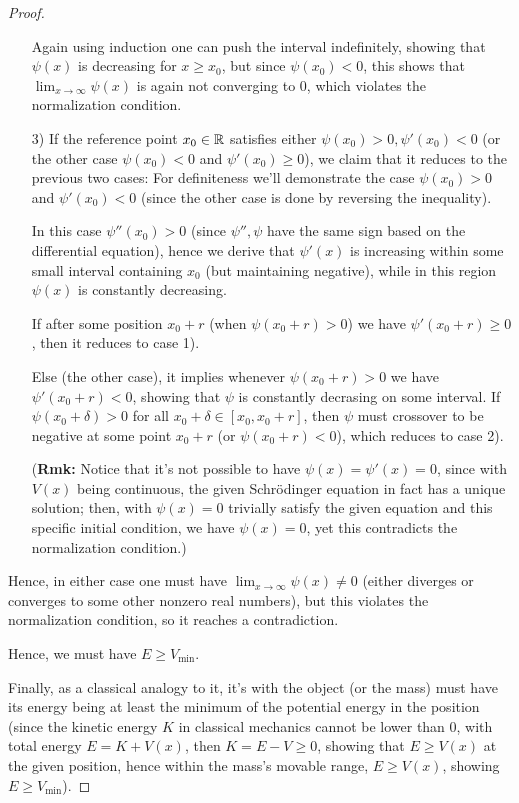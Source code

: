 \documentclass{article}
\begin{document}
\begin{proof}
\begin{itemize}
        Again using induction one can push the interval indefinitely, showing that $\psi(x)$ is decreasing for $x\geq x_0$, but since $\psi(x_0)<0$, this shows that $\lim_{x\rightarrow\infty}\psi(x)$ is again not converging to $0$, which violates the normalization condition.

        \item[3)] If the reference point $x_0\in\mathbb{R}$ satisfies either $\psi(x_0)>0,\psi'(x_0)<0$ (or the other case $\psi(x_0)<0$ and $\psi'(x_0)\geq 0$), we claim that it reduces to the previous two cases: For definiteness we'll demonstrate the case $\psi(x_0)>0$ and $\psi'(x_0)<0$ (since the other case is done by reversing the inequality). 
        
        In this case $\psi''(x_0)>0$ (since $\psi'',\psi$ have the same sign based on the differential equation), hence we derive that $\psi'(x)$ is increasing within some small interval containing $x_0$ (but maintaining negative), while in this region $\psi(x)$ is constantly decreasing.

        If after some position $x_0+r$ (when $\psi(x_0+r)> 0$) we have $\psi'(x_0+r)\geq 0$, then it reduces to case 1).
        
        Else (the other case), it implies whenever $\psi(x_0+r)>0$ we have $\psi'(x_0+r)<0$, showing that $\psi$ is constantly decrasing on some interval. If $\psi(x_0+\delta)>0$ for all $x_0+\delta\in[x_0,x_0+r]$, then $\psi$ must crossover to be negative at some point $x_0+r$ (or $\psi(x_0+r)<0$), which reduces to case 2).

        (\textbf{Rmk:} Notice that it's not possible to have $\psi(x)=\psi'(x)=0$, since with $V(x)$ being continuous, the given Schrödinger equation in fact has a unique solution; then, with $\psi(x)=0$ trivially satisfy the given equation and this specific initial condition, we have $\psi(x)=0$, yet this contradicts the normalization condition.)
    \end{itemize}
    Hence, in either case one must have $\lim_{x\rightarrow\infty}\psi(x)\neq 0$ (either diverges or converges to some other nonzero real numbers), but this violates the normalization condition, so it reaches a contradiction.

    Hence, we must have $E\geq V_{\min}$.

    \hfil
    
    Finally,  as a classical analogy to it, it's with the object (or the mass) must have its energy being at least the minimum of the potential energy in the position (since the kinetic energy $K$ in classical mechanics cannot be lower than $0$, with total energy $E=K+V(x)$, then $K=E-V\geq 0$, showing that $E\geq V(x)$ at the given position, hence within the mass's movable range, $E\geq V(x)$, showing $E\geq V_{\min}$).
\end{proof}
\end{document}
